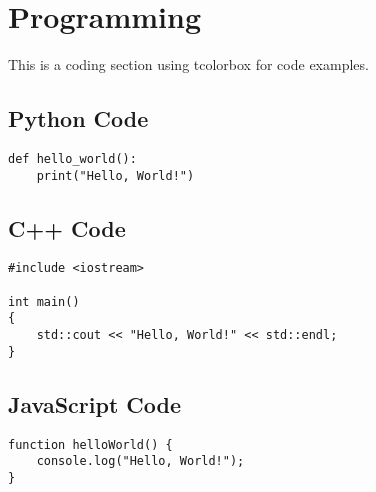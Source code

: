 \section{Programming}

This is a coding section using tcolorbox for code examples.

\subsection{Python Code}
\begin{tcolorbox}[title=Python Code Example]
\begin{verbatim}
def hello_world():
    print("Hello, World!")
\end{verbatim}
\end{tcolorbox}

\subsection{C++ Code}
\begin{tcolorbox}[title=C++ Code Example]
\begin{verbatim}
#include <iostream>

int main()
{
    std::cout << "Hello, World!" << std::endl;
}
\end{verbatim}
\end{tcolorbox}

\subsection{JavaScript Code}
\begin{tcolorbox}[title=JavaScript Code Example]
\begin{verbatim}
function helloWorld() {
    console.log("Hello, World!");
}
\end{verbatim}
\end{tcolorbox}